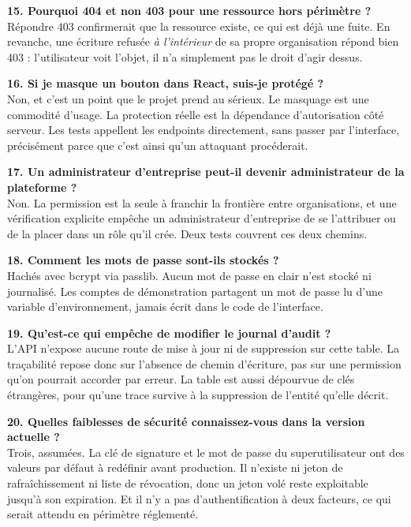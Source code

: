 \textbf{15. Pourquoi 404 et non 403 pour une ressource hors périmètre ?}\\
Répondre 403 confirmerait que la ressource existe, ce qui est déjà une fuite. En
revanche, une écriture refusée \emph{à l'intérieur} de sa propre organisation répond
bien 403 : l'utilisateur voit l'objet, il n'a simplement pas le droit d'agir dessus.

\textbf{16. Si je masque un bouton dans React, suis-je protégé ?}\\
Non, et c'est un point que le projet prend au sérieux. Le masquage est une commodité
d'usage. La protection réelle est la dépendance d'autorisation côté serveur. Les tests
appellent les endpoints directement, sans passer par l'interface, précisément parce que
c'est ainsi qu'un attaquant procéderait.

\textbf{17. Un administrateur d'entreprise peut-il devenir administrateur de la
plateforme ?}\\
Non. La permission  est la seule à franchir la frontière entre
organisations, et une vérification explicite empêche un administrateur d'entreprise de
se l'attribuer ou de la placer dans un rôle qu'il crée. Deux tests couvrent ces deux
chemins.

\textbf{18. Comment les mots de passe sont-ils stockés ?}\\
Hachés avec bcrypt via passlib. Aucun mot de passe en clair n'est stocké ni journalisé.
Les comptes de démonstration partagent un mot de passe lu d'une variable
d'environnement, jamais écrit dans le code de l'interface.

\textbf{19. Qu'est-ce qui empêche de modifier le journal d'audit ?}\\
L'API n'expose aucune route de mise à jour ni de suppression sur cette table. La
traçabilité repose donc sur l'absence de chemin d'écriture, pas sur une permission qu'on
pourrait accorder par erreur. La table est aussi dépourvue de clés étrangères, pour
qu'une trace survive à la suppression de l'entité qu'elle décrit.

\textbf{20. Quelles faiblesses de sécurité connaissez-vous dans la version actuelle ?}\\
Trois, assumées. La clé de signature et le mot de passe du superutilisateur ont des
valeurs par défaut à redéfinir avant production. Il n'existe ni jeton de
rafraîchissement ni liste de révocation, donc un jeton volé reste exploitable jusqu'à
son expiration. Et il n'y a pas d'authentification à deux facteurs, ce qui serait
attendu en périmètre réglementé.

